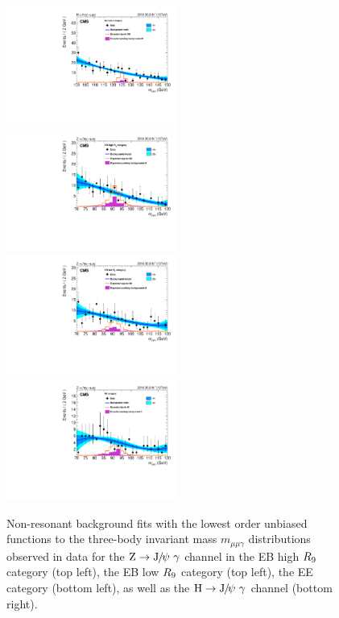 		\begin{figure}[p]
		    \centering
		    \includegraphics[width=0.5\textwidth]{Fig/Fit/bkg/BkgFit_HJpsiG_Inclusive_Bernstein2_Alter1_VisErrorLinTrue}\\
		    \includegraphics[width=0.5\textwidth]{Fig/Fit/bkg/BkgFit_ZJpsiG_EBHR9_Bernstein3_Alter1_VisErrorLinTrue}~
		    \includegraphics[width=0.5\textwidth]{Fig/Fit/bkg/BkgFit_ZJpsiG_EBLR9_Bernstein3_Alter1_VisErrorLinTrue}\\
		    \includegraphics[width=0.5\textwidth]{Fig/Fit/bkg/BkgFit_ZJpsiG_EE_Bernstein3_Alter1_VisErrorLinTrue}\\
		    \caption{\label{fig:finalfit}
		     Non-resonant background fits with the lowest order unbiased functions to the three-body invariant mass $m_{\mu\mu\gamma}$ distributions observed in data for the $\mathrm{Z}\to{\mathrm{J}\hspace{-.08em}/\hspace{-.14em}\psi}\ \gamma$ channel in the EB high $R_\mathrm{9}$ category (top left), the EB low $R_\mathrm{9}$ category (top left), the EE category (bottom left), as well as the $\mathrm{H}\to{\mathrm{J}\hspace{-.08em}/\hspace{-.14em}\psi}\ \gamma$ channel (bottom right).}
		\end{figure}


